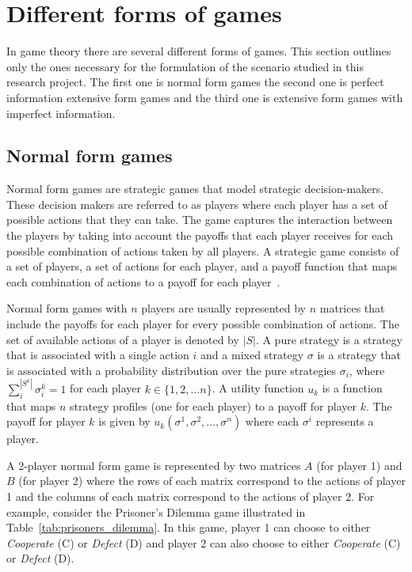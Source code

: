 \section{Different forms of games}\label{sec:game_theory_intro}

In game theory there are several different forms of games.
This section outlines only the ones necessary for the formulation
of the scenario studied in this research project.
The first one is normal form games the second one is perfect information
extensive form games and the third one is extensive form games with imperfect
information.


\subsection{Normal form games}\label{sec:intro_normal_form_games}

Normal form games are strategic games that model strategic decision-makers.
These decision makers are referred to as players where each player has a
set of possible actions that they can take.
The game captures the interaction between the players by taking into account
the payoffs that each player receives for each possible combination of actions
taken by all players.
A strategic game consists of a set of players, a set of actions for each player,
and a payoff function that maps each combination of actions to a payoff for
each player~\cite{osborne2004_normal_form_games}.

Normal form games with \(n\) players are usually represented by \(n\)
matrices that include the payoffs for each player for every possible combination
of actions.
The set of available actions of a player is denoted by \(|S|\).
A pure strategy is a strategy that is associated with a single action \(i\) and
a mixed strategy \(\sigma\) is a strategy that is associated with a probability
distribution over the pure strategies \(\sigma_i\),
where \(\sum_i^{|S^k|}\sigma_i^k = 1\) for each player
\(k \in \{1,2,\dots n\}\).
A utility function \(u_k\) is a function that maps \(n\) strategy profiles (one
for each player) to a payoff for player \(k\).
The payoff for player \(k\) is given by \(u_k(\sigma^1, \sigma^2, \dots,
\sigma^n)\) where each \(\sigma^i\) represents a player. 

A 2-player normal form game is represented by two matrices \(A\) (for player 1)
and \(B\) (for player 2) where the rows of each matrix correspond to the actions
of player 1 and the columns of each matrix correspond to the actions of player
2.
For example, consider the Prisoner's Dilemma game illustrated in
Table~\ref{tab:prisoners_dilemma}.
In this game, player 1 can choose to either \textit{Cooperate} (C) or
\textit{Defect} (D) and player 2 can also choose to either \textit{Cooperate}
(C) or \textit{Defect} (D).

